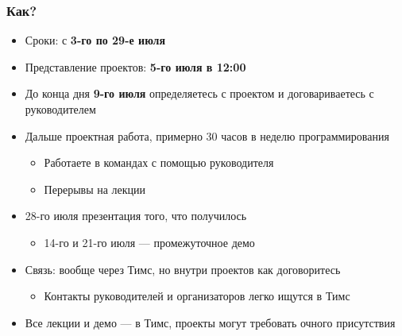 \documentclass[xetex,mathserif,serif]{beamer}
\begin{document}
    \begin{frame}
        \frametitle{Как?}
        \begin{itemize}
            \item Сроки: с \textbf{3-го по 29-е июля}
            \item Представление проектов: \textbf{5-го июля в 12:00}
            \item До конца дня \textbf{9-го июля} определяетесь с проектом и договариваетесь с руководителем
            \item Дальше проектная работа, примерно 30 часов в неделю программирования
            \begin{itemize}
                \item Работаете в командах с помощью руководителя
                \item Перерывы на лекции
            \end{itemize}
            \item 28-го июля презентация того, что получилось
            \begin{itemize}
                \item 14-го и 21-го июля --- промежуточное демо
            \end{itemize}
            \item Связь: вообще через Тимс, но внутри проектов как договоритесь
            \begin{itemize}
                \item Контакты руководителей и организаторов легко ищутся в Тимс
            \end{itemize}
            \item Все лекции и демо --- в Тимс, проекты могут требовать очного присутствия
        \end{itemize}
    \end{frame}
\end{document}
